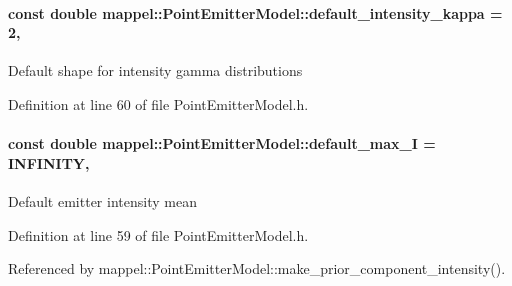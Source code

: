 \paragraph[{\texorpdfstring{default\+\_\+intensity\+\_\+kappa}{default_intensity_kappa}}]{\setlength{\rightskip}{0pt plus 5cm}const double mappel\+::\+Point\+Emitter\+Model\+::default\+\_\+intensity\+\_\+kappa = 2\hspace{0.3cm}{\ttfamily [static]}, {\ttfamily [inherited]}}\hypertarget{classmappel_1_1PointEmitterModel_ad1f21ed3be543deed3c78a0494cb2984}{}\label{classmappel_1_1PointEmitterModel_ad1f21ed3be543deed3c78a0494cb2984}
Default shape for intensity gamma distributions 

Definition at line 60 of file Point\+Emitter\+Model.\+h.

\paragraph[{\texorpdfstring{default\+\_\+max\+\_\+I}{default_max_I}}]{\setlength{\rightskip}{0pt plus 5cm}const double mappel\+::\+Point\+Emitter\+Model\+::default\+\_\+max\+\_\+I = I\+N\+F\+I\+N\+I\+TY\hspace{0.3cm}{\ttfamily [static]}, {\ttfamily [inherited]}}\hypertarget{classmappel_1_1PointEmitterModel_acca80757a9a285a9e6eedea167d038c7}{}\label{classmappel_1_1PointEmitterModel_acca80757a9a285a9e6eedea167d038c7}
Default emitter intensity mean 

Definition at line 59 of file Point\+Emitter\+Model.\+h.



Referenced by mappel\+::\+Point\+Emitter\+Model\+::make\+\_\+prior\+\_\+component\+\_\+intensity().

